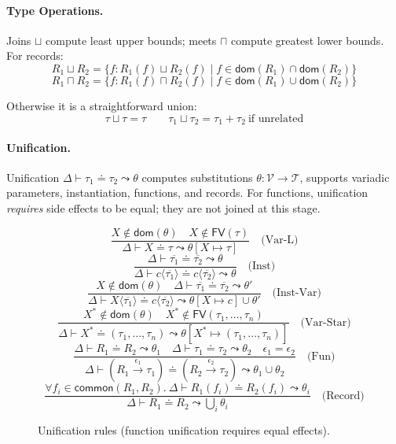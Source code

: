 \paragraph{Type Operations.}  
Joins $\sqcup$ compute least upper bounds; meets $\sqcap$ compute greatest lower bounds.  
For records:  
\[
R_1 \sqcup R_2 = \{f : R_1(f) \sqcup R_2(f) \mid f \in \mathsf{dom}(R_1) \cap \mathsf{dom}(R_2)\}
\]
\[
R_1 \sqcap R_2 = \{f : R_1(f) \sqcap R_2(f) \mid f \in \mathsf{dom}(R_1) \cup \mathsf{dom}(R_2)\}
\]

Otherwise it is a straightforward union:
\[
\tau \sqcup \tau = \tau
\quad\quad
\tau_1 \sqcup \tau_2 = \tau_1 + \tau_2 \ \text{if unrelated}
\]

\paragraph{Unification.}  
Unification $\Delta \vdash \tau_1 \doteq \tau_2 \leadsto \theta$ computes substitutions $\theta : \mathcal{V} \to \mathcal{T}$, supports variadic parameters, instantiation, functions, and records.  
For functions, unification \emph{requires} side effects to be equal; they are not joined at this stage.

\begin{figure*}[t]
\centering
\[
\frac{X \notin \mathsf{dom}(\theta) \quad X \notin \mathsf{FV}(\tau)}{\Delta \vdash X \doteq \tau \leadsto \theta[X \mapsto \tau]} \quad \text{(Var-L)}
\]
\[
\frac{\Delta \vdash \overline{\tau_1} \doteq \overline{\tau_2} \leadsto \theta}{\Delta \vdash c\langle\overline{\tau_1}\rangle \doteq c\langle\overline{\tau_2}\rangle \leadsto \theta} \quad \text{(Inst)}
\]
\[
\frac{X \notin \mathsf{dom}(\theta) \quad \Delta \vdash \overline{\tau_1} \doteq \overline{\tau_2} \leadsto \theta'}{\Delta \vdash X\langle\overline{\tau_1}\rangle \doteq c\langle\overline{\tau_2}\rangle \leadsto \theta[X \mapsto c] \cup \theta'} \quad \text{(Inst-Var)}
\]
\[
\frac{X^* \notin \mathsf{dom}(\theta) \quad X^* \notin \mathsf{FV}(\tau_1, \ldots, \tau_n)}{\Delta \vdash X^* \doteq (\tau_1, \ldots, \tau_n) \leadsto \theta[X^* \mapsto (\tau_1, \ldots, \tau_n)]} \quad \text{(Var-Star)}
\]
\[
\frac{\Delta \vdash R_1 \doteq R_2 \leadsto \theta_1 \quad \Delta \vdash \tau_1 \doteq \tau_2 \leadsto \theta_2 \quad \epsilon_1 = \epsilon_2}{\Delta \vdash (R_1 \xrightarrow{\epsilon_1} \tau_1) \doteq (R_2 \xrightarrow{\epsilon_2} \tau_2) \leadsto \theta_1 \cup \theta_2} \quad \text{(Fun)}
\]
\[
\frac{\forall f_i \in \mathsf{common}(R_1, R_2).\ \Delta \vdash R_1(f_i) \doteq R_2(f_i) \leadsto \theta_i}{\Delta \vdash R_1 \doteq R_2 \leadsto \bigcup_i \theta_i} \quad \text{(Record)}
\]
\caption{Unification rules (function unification requires equal effects).}
\label{fig:unification}
\end{figure*}

